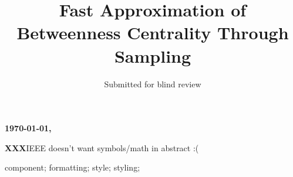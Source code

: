 \documentclass[10pt, conference, compsocconf]{IEEEtran}
\def\XXX{{\bf XXX}}
\begin{document}
\title{Fast Approximation of Betweenness Centrality Through Sampling}
\author{Submitted for blind review}
\maketitle

{\bf \large \today, \currenttime}

\XXX IEEE doesn't want symbols/math in abstract :(


\begin{IEEEkeywords}
component; formatting; style; styling;

\end{IEEEkeywords}












\end{document}

